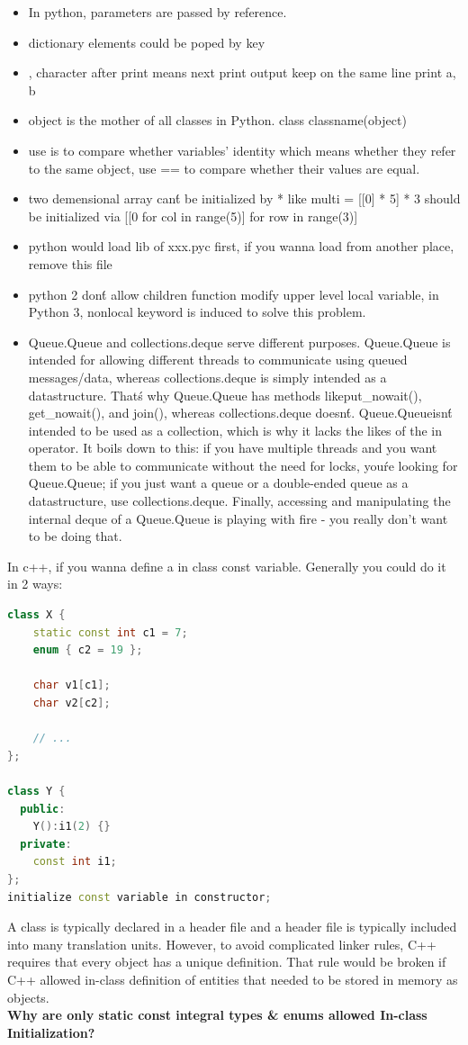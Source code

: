 \documentclass[a4paper]{tufte-handout}
\begin{document}
\begin{itemize}
\item In python, parameters are passed by reference.
\item dictionary elements could be poped by key
\item , character after print means next print output keep on the same line print a, b
\item object is the mother of all classes in Python. class classname(object)
\item use is to compare whether variables' identity which means whether they refer to the same object, use == to compare whether their values are equal.
\item two demensional array can\'t be initialized by * like  multi = [[0] * 5] * 3
  should be initialized via  [[0 for col in range(5)] for row in range(3)]
\item python would load lib of xxx.pyc first, if you wanna load from another place, remove this file
\item python 2 don\'t allow children function modify upper level local variable, in Python 3, nonlocal keyword is induced to solve this problem.
  \item Queue.Queue and collections.deque serve different purposes. Queue.Queue is intended for allowing different threads to communicate using queued messages/data, whereas collections.deque is simply intended as a datastructure. That\'s why Queue.Queue has methods likeput\_nowait(), get\_nowait(), and join(), whereas collections.deque doesn\'t. Queue.Queueisn\'t intended to be used as a collection, which is why it lacks the likes of the in operator.
It boils down to this: if you have multiple threads and you want them to be able to communicate without the need for locks, you\'re looking for Queue.Queue; if you just want a queue or a double-ended queue as a datastructure, use collections.deque.
Finally, accessing and manipulating the internal deque of a Queue.Queue is playing with fire - you really don't want to be doing that.
\end{itemize}

In c++, if you wanna define a in class const variable. Generally you could do it in 2 ways:
\begin{lstlisting}[language=c++]
class X {
	static const int c1 = 7;
	enum { c2 = 19 };

	char v1[c1];
	char v2[c2];

	// ...
};

class Y {
  public:
    Y():i1(2) {}
  private:
    const int i1;
};
initialize const variable in constructor;
\end{lstlisting}
A class is typically declared in a header file and a header file is typically included into many translation units. However, to avoid complicated linker rules, C++ requires that every object has a unique definition. That rule would be broken if C++ allowed in-class definition of entities that needed to be stored in memory as objects.\\
\textbf{Why are only static const integral types \& enums allowed In-class Initialization?}
\end{document}
